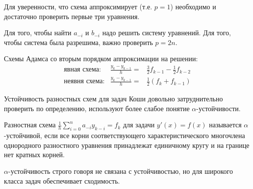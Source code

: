 \begin{remark}
  Для уверенности, что схема аппроксимирует (т.е. $p = 1$)
  необходимо и достаточно проверить первые три уравнения.

  Для того, чтобы найти $a_{-i}$ и $b_{-i}$ надо решить систему уравнений.
  Для того, чтобы система была разрешима, важно проверить $p=2n$.
\end{remark}
\begin{example}
  Схемы Адамса со вторым порядком аппроксимации на решении:
  \[\begin{array}{ccc}
      \text{явная схема}:  & \frac{y_{k}-y_{k-1}}{h} = & \frac{3}{2}f_{k-1}-\frac{1}{2}f_{k-2}   \\
      \text{неявня схема}: & \frac{y_{k}-y_{k-1}}{h} = & \frac{1}{2}\left({f_{k}+f_{k-1}}\right)
    \end{array}\]
\end{example}

Устойчивость разностных схем для задач Коши довольно
затруднительно проверить по определению, используют более слабое понятие
$\alpha$-устойчивости.

\begin{definition}
  Разностная схема $\frac{1}{h}\sum\limits_{i=0}^{n}a_{-i}y_{k-i}=f_k$ для задачи
  $y'(x)=f(x)$ называется $\alpha$-устойчивой, если все корни
  соответствующего характеристического многочлена однородного
  разностного уравнения принадлежат единичному кругу и на границе
  нет кратных корней.
\end{definition}

\begin{remark}
  $\alpha$-устойчивость строго говоря не связана с устойчивостью, но
  для широкого класса задач обеспечивает сходимость.
\end{remark}
\newpage

\def\SingleImageScale {0.5}

